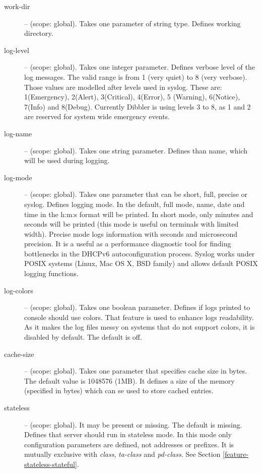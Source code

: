 \begin{description}
\item[work-dir] -- (scope: global). Takes one parameter of string
  type. Defines working directory.

\item[log-level] -- (scope: global). Takes one integer
  parameter. Defines verbose level of the log messages. The valid range
  is from 1 (very quiet) to 8 (very verbose). Those values are modelled
  after levels used in syslog. These are: 1(Emergency), 2(Alert),
  3(Critical), 4(Error), 5 (Warning), 6(Notice), 7(Info) and
  8(Debug). Currently Dibbler is using levels 3 to 8, as 1 and 2 are
  reserved for system wide emergency events.

\item[log-name] -- (scope: global). Takes one string
  parameter. Defines than name, which will be used during logging.

\item[log-mode] -- (scope: global). Takes one parameter that can be
  short, full, precise or syslog. Defines logging mode. In the
  default, full mode, name, date and time in the h:m:s format will be
  printed. In short mode, only minutes and seconds will be printed
  (this mode is useful on terminals with limited width). Precise mode
  logs information with seconds and microsecond precision. It is a
  useful as a performance diagnostic tool for finding bottlenecks in
  the DHCPv6 autoconfiguration process. Syslog works under POSIX
  systems (Linux, Mac OS X, BSD family) and allows default POSIX
  logging functions.
  
\item[log-colors] -- (scope: global). Takes one boolean parameter.
  Defines if logs printed to console should use colors. That feature
  is used to enhance logs readability.  As it makes the log files
  messy on systems that do not support colors, it is disabled by
  default. The default is off.

 \item[cache-size] -- (scope: global). Takes one parameter that
  specifies cache size in bytes. The default value is 1048576
  (1MB). It defines a size of the memory (specified in bytes) which
  can se used to store cached entries.

\item[stateless] -- (scope: global). It may be present or missing. The
  default is missing. Defines that server should run in stateless
  mode. In this mode only configuration parameters are defined, not
  addresses or prefixes. It is mutually exclusive
  with \emph{class}, \emph{ta-class} and \emph{pd-class}. See
  Section \ref{feature-stateless-stateful}.



\end{description}
